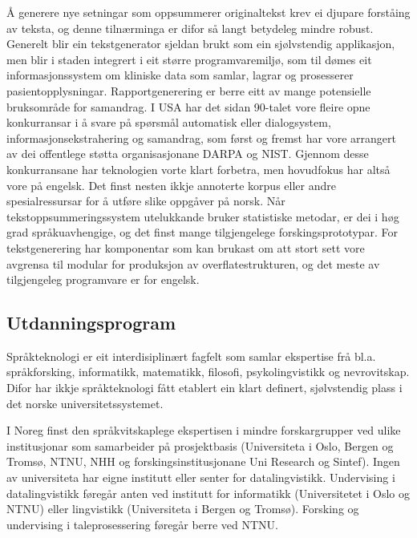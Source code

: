 \begin{multicols}{2}

Å generere nye setningar som oppsummerer originaltekst krev ei djupare forståing av teksta, og denne tilnærminga er difor så langt betydeleg mindre robust. Generelt blir ein tekstgenerator sjeldan brukt som ein sjølvstendig applikasjon, men blir i staden integrert i eit større programvaremiljø, som til dømes eit informasjonssystem om kliniske data som samlar, lagrar og prosesserer pasientopplysningar. Rapportgenerering er berre eitt av mange potensielle bruksområde for samandrag.
I USA har det sidan 90-talet vore fleire opne konkurransar i å svare på spørsmål automatisk eller dialogsystem, informasjonsekstrahering og samandrag, som først og fremst har vore arrangert av dei offentlege støtta organisasjonane DARPA og NIST. Gjennom desse konkurransane har teknologien vorte klart forbetra, men hovudfokus har altså vore på engelsk. 
Det finst nesten ikkje annoterte korpus eller andre spesialressursar for å utføre slike oppgåver på norsk. 
Når tekstoppsummeringssystem utelukkande bruker statistiske metodar, er dei i høg grad språkuavhengige, og det finst mange tilgjengelege forskingsprototypar. 
For tekstgenerering har komponentar som kan brukast om att stort sett vore avgrensa til modular for produksjon av overflatestrukturen, og det meste av tilgjengeleg programvare er for engelsk. 

\subsection{Utdanningsprogram}

Språkteknologi er eit interdisiplinært fagfelt som samlar ekspertise frå bl.a. språkforsking, informatikk, matematikk, filosofi, psykolingvistikk og nevrovitskap.
Difor har ikkje språkteknologi fått etablert ein klart definert, sjølvstendig plass i det norske universitetssystemet. 

I Noreg finst den språkvitskaplege ekspertisen i mindre forskargrupper ved ulike institusjonar som samarbeider på prosjektbasis (Universiteta i Oslo, Bergen og Tromsø, NTNU, NHH og forskingsinstitusjonane Uni Research og Sintef). Ingen av universiteta har eigne institutt eller senter for datalingvistikk. Undervising i datalingvistikk føregår anten ved institutt for informatikk (Universitetet i Oslo og NTNU) eller lingvistikk (Universiteta i Bergen og Tromsø). Forsking og undervising i taleprosessering føregår berre ved NTNU.


\end{multicols}
